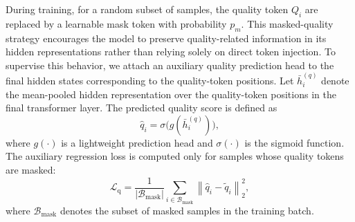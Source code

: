 \documentclass[lettersize,journal]{IEEEtran}
\begin{document}
During training, for a random subset of samples, the quality token $Q_i$ are replaced by a learnable mask token with probability $p_m$. This masked-quality strategy encourages the model to preserve quality-related information in its hidden representations rather than relying solely on direct token injection. To supervise this behavior, we attach an auxiliary quality prediction head to the final hidden states corresponding to the quality-token positions. Let
  $\bar{h}_i^{(q)}$ 
denote the mean-pooled hidden representation over the quality-token positions in the final transformer layer. The predicted quality score is defined as
  \begin{equation}
  \hat{q}_i=\sigma\bigl(g(\bar{h}_i^{(q)})\bigr),
  \end{equation}
where $g(\cdot)$ is a lightweight prediction head and $\sigma(\cdot)$ is the sigmoid function. The auxiliary regression loss is computed only for samples whose quality tokens are masked:
  \begin{equation}
    \mathcal{L}_{\mathrm{q}}=
    \frac{1}{|\mathcal{B}_{\mathrm{mask}}|}
    \sum_{i\in\mathcal{B}_{\mathrm{mask}}}
    \left\|\hat{q}_i-\tilde{q}_i\right\|_2^2,
  \end{equation}
where $\mathcal{B}_{\mathrm{mask}}$ denotes the subset of masked samples in the training batch.
\end{document}

